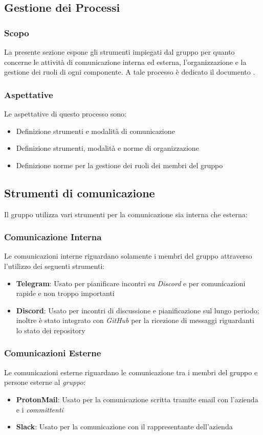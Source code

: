 \subsection{Gestione dei Processi} %
\subsubsection{Scopo}
La presente sezione espone gli strumenti impiegati dal gruppo \teamname{} per quanto concerne le attività di comunicazione interna ed esterna, l'organizzazione e la gestione dei ruoli di ogni componente. %
A tale processo è dedicato il documento \PdP{}.

\subsubsection{Aspettative}
Le aspettative di questo processo sono:
\begin{itemize}
	\item Definizione strumenti e modalità di comunicazione
	\item Definizione strumenti, modalità e norme di organizzazione
	\item Definizione norme per la gestione dei ruoli dei membri del gruppo
\end{itemize}

\subsection{Strumenti di comunicazione}
Il gruppo \teamname{} utilizza vari strumenti per la comunicazione sia interna che esterna:
	\subsubsection{Comunicazione Interna}
		Le comunicazioni interne riguardano solamente i membri del gruppo \teamname{} attraverso l'utilizzo dei seguenti strumenti:
			\begin{itemize}
				\item \textbf{Telegram}: Usato per pianificare incontri su \emph{Discord} e per comunicazioni rapide e non troppo importanti
				\item \textbf{Discord}: Usato per incontri di discussione e pianificazione sul lungo periodo; inoltre è stato integrato con \emph{GitHub} per la ricezione di messaggi riguardanti lo stato dei repository
			\end{itemize}
	\subsubsection{Comunicazioni Esterne}
	\label{sec:Comunicazioni Esterne}
		Le comunicazioni esterne riguardano le comunicazione tra i membri del gruppo \teamname e persone esterne al \emph{gruppo}:
			\begin{itemize}
				\item \textbf{ProtonMail}: Usato per la comunicazione scritta tramite email con l'azienda \proponente e i \emph{committenti}
				\item \textbf{Slack}: Usato per la comunicazione con il rappresentante dell'azienda \proponente
			\end{itemize}

